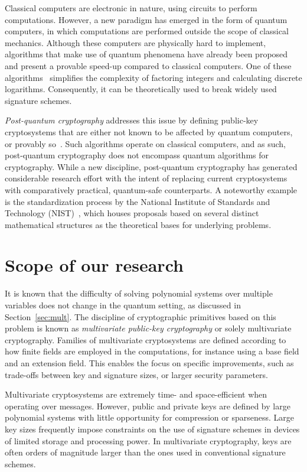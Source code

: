 \documentclass[12pt, a4paper, oneside]{memoir}
\theoremstyle{definition}
\begin{document}
Classical computers are electronic in nature, using circuits to perform computations. However, a new paradigm has emerged in the form of quantum computers, in which computations are performed outside the scope of classical mechanics. Although these computers are physically hard to implement, algorithms that make use of quantum phenomena have already been proposed and present a provable speed-up compared to classical computers. One of these algorithms~\cite{Shor:199710} simplifies the complexity of factoring integers and calculating discrete logarithms. Consequently, it can be theoretically used to break widely used signature schemes.

\emph{Post-quantum cryptography} addresses this issue by defining public-key cryptosystems that are either not known to be affected by quantum computers, or provably so~\cite{Bernstein:2008}. Such algorithms operate on classical computers, and as such, post-quantum cryptography does not encompass quantum algorithms for cryptography. While a new discipline, post-quantum cryptography has generated considerable research effort with the intent of replacing current cryptosystems with comparatively practical, quantum-safe counterparts. A noteworthy example is the standardization process by the National Institute of Standards and Technology (NIST)~\cite{Alagic:201901,Alagic:202007}, which houses proposals based on several distinct mathematical structures as the theoretical bases for underlying problems.

\section{Scope of our research}

It is known that the difficulty of solving polynomial systems over multiple variables does not change in the quantum setting, as discussed in Section~\ref{sec:mult}. The discipline of cryptographic primitives based on this problem is known as \textit{multivariate public-key cryptography} or solely multivariate cryptography. Families of multivariate cryptosystems are defined according to how finite fields are employed in the computations, for instance using a base field and an extension field. This enables the focus on specific improvements, such as trade-offs between key and signature sizes, or larger security parameters.

Multivariate cryptosystems are extremely time- and space-efficient when operating over messages. However, public and private keys are defined by large polynomial systems with little opportunity for compression or sparseness. Large key sizes frequently impose constraints on the use of signature schemes in devices of limited storage and processing power. In multivariate cryptography, keys are often orders of magnitude larger than the ones used in conventional signature schemes.
\end{document}

